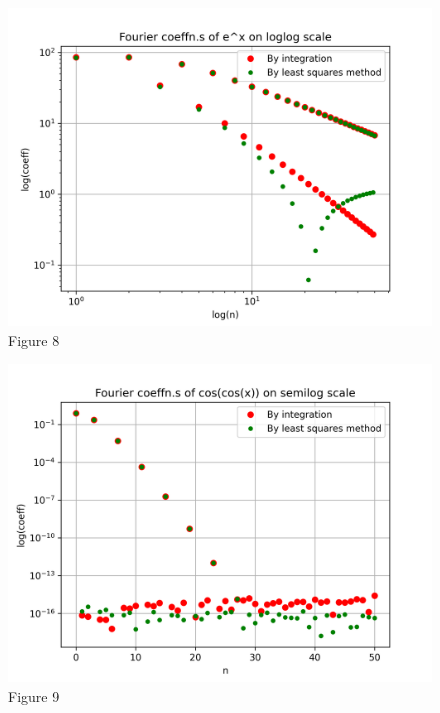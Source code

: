 \documentclass[11pt, a4paper]{article}
\begin{document}
\begin{figure}[!tbh]
\centering
\includegraphics[scale=0.6]{assn4_plot8.png}
\caption{Figure 8}
\label{fig:plot8}
\end{figure} 

\begin{figure}[!tbh]
\centering
\includegraphics[scale=0.6]{assn4_plot9.png}
\caption{Figure 9}
\label{fig:plot9}
\end{figure} 
\end{document}
